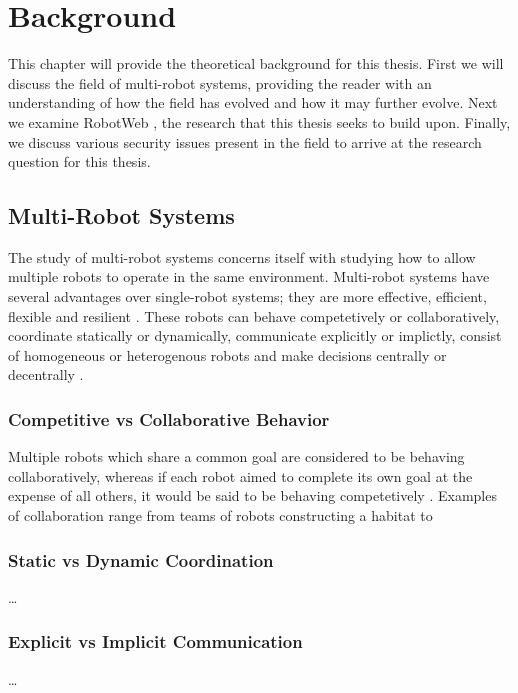 \chapter{Background}

This chapter will provide the theoretical background for this thesis. First we will discuss the field of multi-robot systems, providing the reader with an understanding of how the field has evolved and how it may further evolve. Next we examine RobotWeb \cite{Robotweb}, the research that this thesis seeks to build upon. Finally, we discuss various security issues present in the field to arrive at the research question for this thesis.

\section{Multi-Robot Systems} %
The study of multi-robot systems concerns itself with studying how to allow multiple robots to operate in the same environment. Multi-robot systems have several advantages over single-robot systems; they are more effective, efficient, flexible and resilient \cite{MultiVsSingleRobotSystems}. These robots can behave competetively or collaboratively, coordinate statically or dynamically, communicate  explicitly or implictly, consist of homogeneous or heterogenous robots and make decisions centrally or decentrally \cite{MultiRobotCoordinationSurvey}.

\subsection{Competitive vs Collaborative Behavior}
Multiple robots which share a common goal are considered to be behaving collaboratively, whereas if each robot aimed to complete its own goal at the expense of all others, it would be said to be behaving competetively \cite{MultiRobotCoordinationSurvey}. Examples of collaboration range from teams of robots constructing a habitat \cite{LunarHabitatConstruction} to 

\subsection{Static vs Dynamic Coordination}
\dots

\subsection{Explicit vs Implicit Communication}
\dots

